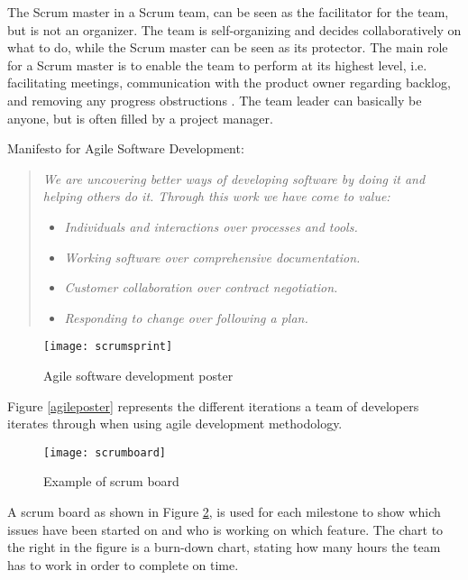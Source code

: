 The Scrum master in a Scrum team, can be seen as the facilitator for the team, but is not an organizer. The team is self-organizing and decides collaboratively on what to do, while the Scrum master can be seen as its protector. The main role for a Scrum master is to enable the team to perform at its highest level, i.e. facilitating meetings, communication with the product owner regarding backlog, and removing any progress obstructions \citep{schwaber2002agile}. The team leader can basically be anyone, but is often filled by a project manager. 

Manifesto for Agile Software Development:\citep{agilemanifesto}
\begin{quotation}
\emph{We are uncovering better ways of developing software by doing it and helping others do it. Through this work we have come to value:}
\begin{itemize}
\item \emph{Individuals and interactions over processes and tools.}
\item \emph{Working software over comprehensive documentation.}
\item \emph{Customer collaboration over contract negotiation.}
\item \emph{Responding to change over following a plan.}
\end{itemize}
\end{quotation}

\begin{figure}[!htpb]
\centering
	\texttt{[image: scrumsprint]}
\caption{Agile software development poster \citep{scrumsprint}}
\label{scrumsprint}
\end{figure}

Figure \ref{agileposter} represents the different iterations a team of developers iterates through when using agile development methodology.

\begin{figure}[!htpb]
\centering
	\texttt{[image: scrumboard]}
\caption{Example of scrum board \citep{scrumboard}}
\label{scrumboard}
\end{figure}

A scrum board as shown in Figure \ref{scrumboard}, is used for each milestone to show which issues have been started on and who is working on which feature. The chart to the right in the figure is a burn-down chart, stating how many hours the team has to work in order to complete on time.
